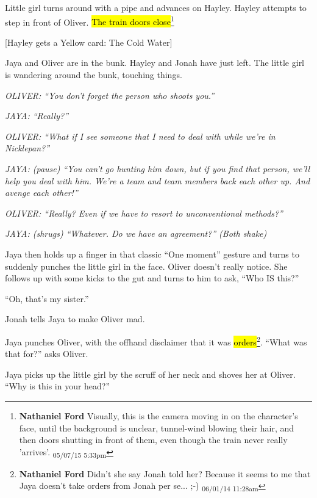 Little girl turns around with a pipe and advances on Hayley.  Hayley attempts to step in front of Oliver.  \hl{The train doors close}\footnote{\textbf{Nathaniel Ford }Visually, this is the camera moving in on the character's face, until the background is unclear, tunnel-wind blowing their hair, and then doors shutting in front of them, even though the train never really 'arrives'. \textsubscript{05/07/15 5:33pm}}



{[}Hayley gets a Yellow card: The Cold Water{]}






Jaya and Oliver are in the bunk.  Hayley and Jonah have just left.  The little girl is wandering around the bunk, touching things.

\textit{OLIVER: ``You don't forget the person who shoots you.''}

\textit{JAYA: ``Really?''}

\textit{OLIVER: ``What if I see someone that I need to deal with while we're in Nicklepan?''}

\textit{JAYA: (pause) ``You can't go hunting him down, but if you find that person, we'll help you deal with him.  We're a team and team members back each other up. And avenge each other!''}

\textit{OLIVER: ``Really?  Even if we have to resort to unconventional methods?''}

\textit{JAYA: (shrugs)  ``Whatever.  Do we have an agreement?''  (Both shake)}

Jaya then holds up a  finger in that classic ``One moment'' gesture and turns to suddenly punches the little girl in the face.  Oliver doesn't really notice.  She follows up with some kicks to the gut and turns to him to ask,  ``Who IS this?''

``Oh, that's my sister.''

Jonah tells Jaya to make Oliver mad.

Jaya punches Oliver, with the offhand disclaimer that it was \hl{orders}\footnote{\textbf{Nathaniel Ford }Didn't she say Jonah told her? Because it seems to me that Jaya doesn't take orders from Jonah per se... ;-) \textsubscript{06/01/14 11:28am}}.  ``What was that for?'' asks Oliver.

Jaya picks up the little girl by the scruff of her neck and shoves her at Oliver.  ``Why is this in your head?''

